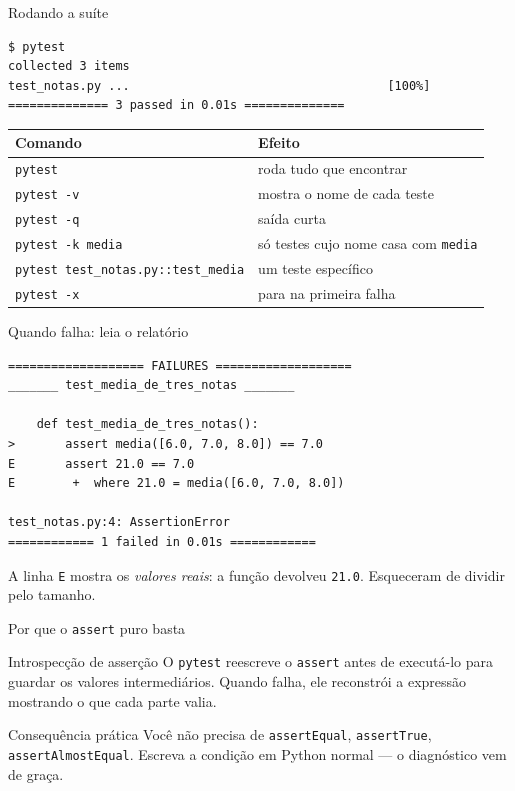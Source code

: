 \documentclass[aspectratio=169]{beamer}
\begin{document}
\begin{frame}[fragile]{Rodando a suíte}
\begin{lstlisting}[style=terminal]
$ pytest
collected 3 items
test_notas.py ...                                    [100%]
============== 3 passed in 0.01s ==============
\end{lstlisting}
  \vspace{0.3em}
  \begin{center}
  \small
  \begin{tabular}{ll}
    \toprule
    \textbf{Comando} & \textbf{Efeito} \\
    \midrule
    \texttt{pytest}                    & roda tudo que encontrar \\
    \texttt{pytest -v}                 & mostra o nome de cada teste \\
    \texttt{pytest -q}                 & saída curta \\
    \texttt{pytest -k media}           & só testes cujo nome casa com \texttt{media} \\
    \texttt{pytest test\_notas.py::test\_media} & um teste específico \\
    \texttt{pytest -x}                 & para na primeira falha \\
    \bottomrule
  \end{tabular}
  \end{center}
\end{frame}

\begin{frame}[fragile]{Quando falha: leia o relatório}
\begin{lstlisting}[style=terminal]
=================== FAILURES ===================
_______ test_media_de_tres_notas _______

    def test_media_de_tres_notas():
>       assert media([6.0, 7.0, 8.0]) == 7.0
E       assert 21.0 == 7.0
E        +  where 21.0 = media([6.0, 7.0, 8.0])

test_notas.py:4: AssertionError
============ 1 failed in 0.01s ============
\end{lstlisting}
  \small A linha \texttt{E} mostra os \emph{valores reais}: a função devolveu
  \texttt{21.0}. Esqueceram de dividir pelo tamanho.
\end{frame}

\begin{frame}{Por que o \texttt{assert} puro basta}
  \begin{block}{Introspecção de asserção}
    O \texttt{pytest} reescreve o \texttt{assert} antes de executá-lo para
    guardar os valores intermediários. Quando falha, ele reconstrói a
    expressão mostrando o que cada parte valia.
  \end{block}
  \begin{exampleblock}{Consequência prática}
    Você não precisa de \texttt{assertEqual}, \texttt{assertTrue},
    \texttt{assertAlmostEqual}. Escreva a condição em Python normal ---
    o diagnóstico vem de graça.
  \end{exampleblock}
\end{frame}
\end{document}
